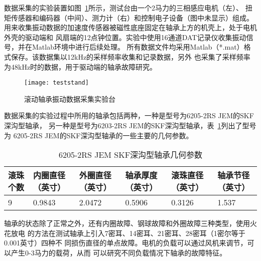 数据采集的实验装置如图~\ref{fig:teststand}所示，测试台由一个2马力的三相感应电机（左）、
扭矩传感器和编码器（中间）、测力计（右）和控制电子设备（图中未显示）组成。 
用来收集振动数据的加速度传感器被磁性底座固定在轴承上方的机壳上，处于电机外壳的驱动端和
风扇端的12点钟位置。实验中使用16通道DAT记录仪收集振动信号，并在Matlab环境中进行后续处理。
所有数据文件均采用Matlab（*.mat）格式保存。该数据集以12kHz的采样频率收集和记录数据，另外
也采集了采样频率为48kHz时的数据，用于驱动端的轴承故障研究。
\begin{figure}[ht]
  \centering
  \texttt{[image: teststand]}
  \caption{滚动轴承振动数据采集实验台}
  \label{fig:teststand}
\end{figure}

数据采集的实验过程中所用的轴承包括两种，一种是型号为6205-2RS JEM的SKF深沟型轴承，
另一种是型号为6203-2RS JEM的SKF深沟型轴承，表~\ref{tab:bearing_params}列出了型号为
6205-2RS JEM的SKF深沟型轴承的一些主要的几何参数。
\begin{table}[htb]
  \centering
  \begin{minipage}[t]{0.8\linewidth}
  \caption{6205-2RS JEM SKF深沟型轴承几何参数}
  \label{tab:bearing_params}
    \begin{tabularx}{\linewidth}{lXXXXX}
      \toprule[1.5pt]
      滚珠个数 & 内圈直径（英寸）& 外圈直径（英寸）& 轴承厚度（英寸）& 滚珠直径（英寸）& 轴承节径（英寸） \\\midrule[1pt]
      9 & 0.9843 & 2.0472 & 0.5906 & 0.3126 & 1.537 \\\bottomrule[1.5pt]
    \end{tabularx}
  \end{minipage}
\end{table}

轴承的状态除了正常之外，还有内圈故障、钢球故障和外圈故障三种类型，使用火花放电
的方法在测试轴承上引入7密耳、14密耳、21密耳、28密耳（1密尔等于0.001英寸）四种不
同损伤直径的单点故障。电机的负载可以通过风机来调节，可以产生0-3马力的载荷，从而
可以研究不同负载情况下轴承的故障特征。


